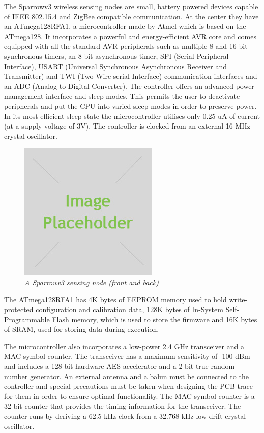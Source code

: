 The Sparrowv3 wireless sensing nodes are small, battery powered devices capable
of IEEE 802.15.4 and ZigBee compatible communication. At the center they have
an \mbox{ATmega128RFA1}, a microcontroller made by Atmel which is based on the
\mbox{ATmega128}. It incorporates a powerful and energy-efficient AVR
core and comes equipped with all the standard AVR peripherals such as multiple 
8 and 16-bit synchronous timers, an 8-bit asynchronous timer, SPI (Serial
Peripheral Interface), USART (Universal Synchronous Asynchronous Receiver
and Transmitter) and TWI (Two Wire serial Interface) communication interfaces 
and an ADC (Analog-to-Digital Converter). The controller offers an advanced power 
management interface and sleep modes. This permits the user to deactivate 
peripherals and put the CPU into varied sleep modes in order to preserve 
power. In its most efficient sleep state the microcontroller utilises only 
0.25 uA of current (at a supply voltage of 3V). The controller is clocked from an
external 16 MHz crystal oscillator.

\begin{figure}[ht]
	\begin{center}
		\includegraphics{img/placeholder.jpg}
	\end{center}
	\caption{\small \itshape{A Sparrowv3 sensing node (front and back)}}
\end{figure}

The \mbox{ATmega128RFA1} has 4K bytes of EEPROM memory used to hold
write-protected configuration and calibration data, 128K bytes of In-System
Self-Programmable Flash memory, which is used to store the firmware and 16K
bytes of SRAM, used for storing data during execution.

The microcontroller also incorporates a low-power 2.4 GHz transceiver and a MAC
symbol counter. The transceiver has a maximum sensitivity of -100 dBm and
includes a 128-bit hardware AES accelerator and a 2-bit true random number
generator. An external antenna and a balun must be connected to the
controller and special precautions must be taken when designing the PCB trace
for them in order to ensure optimal functionality. The MAC symbol counter is 
a 32-bit counter that provides the timing information for the transceiver. 
The counter runs by deriving a 62.5 kHz clock from a 32.768 kHz low-drift 
crystal oscillator. 

